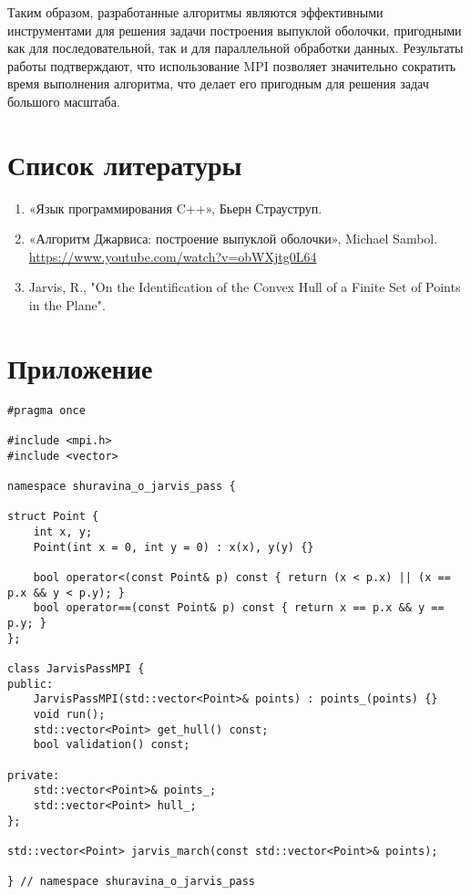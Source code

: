 \documentclass[12pt]{article}
\begin{document}
Таким образом, разработанные алгоритмы являются эффективными инструментами для решения задачи построения выпуклой оболочки, пригодными как для последовательной, так и для параллельной обработки данных. Результаты работы подтверждают, что использование MPI позволяет значительно сократить время выполнения алгоритма, что делает его пригодным для решения задач большого масштаба.

\newpage
\section*{Список литературы}
\begin{enumerate}
    \item «Язык программирования C++», Бьерн Страуструп.
    \item «Алгоритм Джарвиса: построение выпуклой оболочки», Michael Sambol. \url{https://www.youtube.com/watch?v=obWXjtg0L64}
    \item Jarvis, R., "On the Identification of the Convex Hull of a Finite Set of Points in the Plane".
\end{enumerate}

\newpage
\section*{Приложение}

\begin{lstlisting}[caption={ops\_mpi\_.hpp}]
#pragma once

#include <mpi.h>
#include <vector>

namespace shuravina_o_jarvis_pass {

struct Point {
    int x, y;
    Point(int x = 0, int y = 0) : x(x), y(y) {}

    bool operator<(const Point& p) const { return (x < p.x) || (x == p.x && y < p.y); }
    bool operator==(const Point& p) const { return x == p.x && y == p.y; }
};

class JarvisPassMPI {
public:
    JarvisPassMPI(std::vector<Point>& points) : points_(points) {}
    void run();
    std::vector<Point> get_hull() const;
    bool validation() const;

private:
    std::vector<Point>& points_;
    std::vector<Point> hull_;
};

std::vector<Point> jarvis_march(const std::vector<Point>& points);

} // namespace shuravina_o_jarvis_pass
\end{lstlisting}
\end{document}
